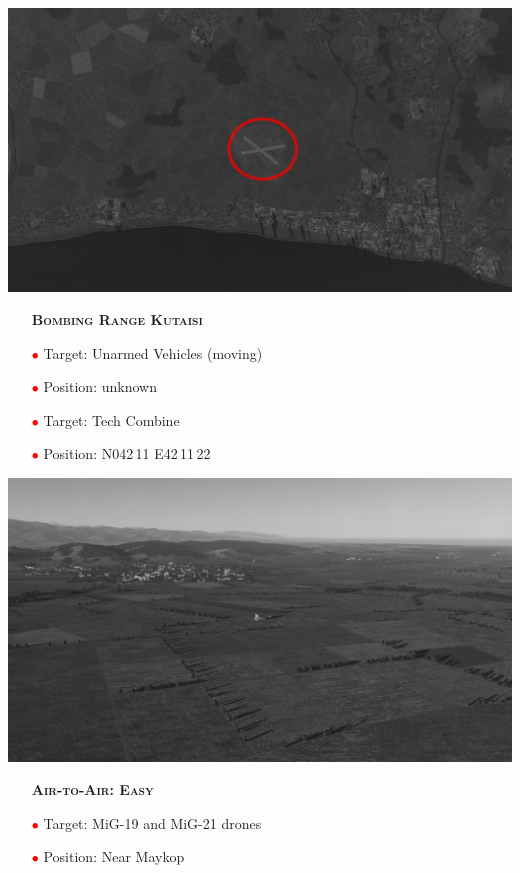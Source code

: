 \documentclass[a4paper,12pt,dvipsnames]{letter}
\newcommand{\myHead}[1]{{\LARGE\textsc{\textbf{#1}}}}
\newcommand{\ri}{\textcolor{Red}{$\bullet$\;}}
\begin{document}
{\begin{center}
\includegraphics[width=0.7\linewidth]{../gimp/Range_Kobuleti_Sat.png}
\end{center}
%
\newpage
\begin{itemize}
 \item[] \myHead{Bombing Range Kutaisi}
 \item[\ri] Target: Unarmed Vehicles (moving)
 \item[\ri] Position: unknown
 \item[\ri] Target: Tech Combine
 \item[\ri] Position: N042\,11 E42\,11\,22 
\end{itemize}
\begin{center}
 \includegraphics[width=0.7\linewidth]{../gimp/Range_Kutaisi_Pic1.png}
\end{center}
%
\newpage
\begin{itemize}
 \item[] \myHead{Air-to-Air: Easy}
 \item[\ri] Target: MiG-19 and MiG-21 drones
 \item[\ri] Position: Near Maykop
\end{itemize}
%
\newpage
\begin{itemize}

\end{itemize}}
\end{document}
